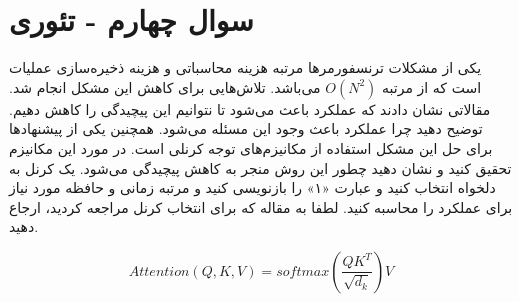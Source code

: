 \section{سوال چهارم - تئوری}

یکی از مشکلات ترنسفورمرها مرتبه هزینه محاسباتی و هزینه ذخیره‌سازی عملیات  است که از مرتبه $O(N^2)$ می‌باشد. تلاش‌هایی برای کاهش این مشکل انجام شد. مقالاتی نشان دادند که عملکرد  باعث می‌شود تا نتوانیم این پیچیدگی را کاهش دهیم. توضیح دهید چرا عملکرد  باعث وجود این مسئله می‌شود. همچنین یکی از پیشنهادها برای حل این مشکل استفاده از مکانیزم‌های توجه کرنلی است. در مورد این مکانیزم تحقیق کنید و نشان دهید چطور این روش منجر به کاهش پیچیدگی می‌شود. یک کرنل به دلخواه انتخاب کنید و عبارت «۱» را بازنویسی کنید و مرتبه زمانی و حافظه مورد نیاز برای عملکرد  را محاسبه کنید. لطفا به مقاله که برای انتخاب کرنل مراجعه کردید، ارجاع دهید.

\begin{equation}
	Attention(Q, K, V)=softmax(\frac{QK^T}{\sqrt{d_k}})V
\end{equation}


































